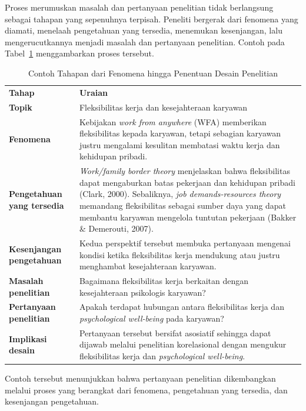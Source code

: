 \documentclass[
  indonesian,
  letterpaper,
  DIV=11,
  numbers=noendperiod]{scrreprt}
\begin{document}
Proses merumuskan masalah dan pertanyaan penelitian tidak berlangsung
sebagai tahapan yang sepenuhnya terpisah. Peneliti bergerak dari
fenomena yang diamati, menelaah pengetahuan yang tersedia, menemukan
kesenjangan, lalu mengerucutkannya menjadi masalah dan pertanyaan
penelitian. Contoh pada Tabel~\ref{tbl-contoh} menggambarkan proses
tersebut.

\begin{longtable}[]{@{}
  >{\raggedright\arraybackslash}p{}
  >{\raggedright\arraybackslash}p{}@{}}
\caption{Contoh Tahapan dari Fenomena hingga Penentuan Desain
Penelitian}\label{tbl-contoh}\tabularnewline
\toprule\noalign{}
\endfirsthead
\endhead
\bottomrule\noalign{}
\endlastfoot
\textbf{Tahap} & \textbf{Uraian} \\
\textbf{Topik} & Fleksibilitas kerja dan kesejahteraan karyawan \\
\textbf{Fenomena} & Kebijakan \emph{work from anywhere} (WFA) memberikan
fleksibilitas kepada karyawan, tetapi sebagian karyawan justru mengalami
kesulitan membatasi waktu kerja dan kehidupan pribadi. \\
\textbf{Pengetahuan yang tersedia} & \emph{Work/family border theory}
menjelaskan bahwa fleksibilitas dapat mengaburkan batas pekerjaan dan
kehidupan pribadi (Clark, 2000). Sebaliknya, \emph{job demands-resources
theory} memandang fleksibilitas sebagai sumber daya yang dapat membantu
karyawan mengelola tuntutan pekerjaan (Bakker \& Demerouti, 2007). \\
\textbf{Kesenjangan pengetahuan} & Kedua perspektif tersebut membuka
pertanyaan mengenai kondisi ketika fleksibilitas kerja mendukung atau
justru menghambat kesejahteraan karyawan. \\
\textbf{Masalah penelitian} & Bagaimana fleksibilitas kerja berkaitan
dengan kesejahteraan psikologis karyawan? \\
\textbf{Pertanyaan penelitian} & Apakah terdapat hubungan antara
fleksibilitas kerja dan \emph{psychological well-being} pada
karyawan? \\
\textbf{Implikasi desain} & Pertanyaan tersebut bersifat asosiatif
sehingga dapat dijawab melalui penelitian korelasional dengan mengukur
fleksibilitas kerja dan \emph{psychological well-being}. \\
\end{longtable}

Contoh tersebut menunjukkan bahwa pertanyaan penelitian dikembangkan
melalui proses yang berangkat dari fenomena, pengetahuan yang tersedia,
dan kesenjangan pengetahuan.
\end{document}
